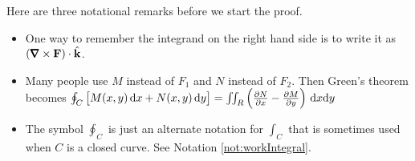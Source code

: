 \noindent
Here are three notational remarks before we start the proof.
\begin{itemize}\itemsep1pt \parskip0pt  \itemindent-15pt
\item[$\circ$]
One way to remember the integrand on the right hand side is to write it
as $(\vnabla\times\vF)\cdot\hk$.
\item[$\circ$]
Many people use $M$ instead of $F_1$ and $N$ instead of $F_2$.
Then Green's theorem becomes 
$\oint_{C} \big[M(x,y)\,\dee{x} +N(x,y)\,\dee{y}\big]
 =\dblInt_{R}\Big(\frac{\partial N}{\partial x} 
                - \frac{\partial M}{\partial y}\Big)\ \dee{x}\dee{y}$
\item[$\circ$] The symbol $\oint_C$ is just an alternate notation for $\int_C$
that is sometimes used when $C$ is a closed curve. 
See Notation \ref{not:workIntegral}.
\end{itemize}
